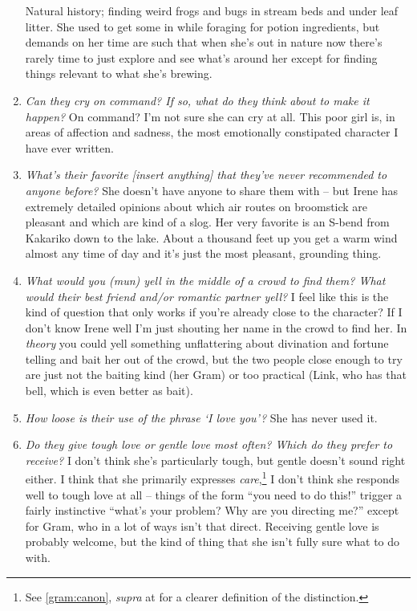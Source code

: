 \begin{enumerate}
      Natural history; finding weird frogs and bugs in stream beds and under leaf litter. She used to get some in while foraging for potion ingredients, but demands on her time are such that when she's out in nature now there's rarely time to just explore and see what's around her except for finding things relevant to what she's brewing.
    \item \label{irene:characterq:emotionallyconstipated}\textit{Can they cry on command? If so, what do they think about to make it happen?}
      On command? I'm not sure she can cry at all. This poor girl is, in areas of affection and sadness, the most emotionally constipated character I have ever written.
    \item \textit{What’s their favorite [insert anything] that they’ve never recommended to anyone before?}
      She doesn't have anyone to share them with -- but Irene has extremely detailed opinions about which air routes on broomstick are pleasant and which are kind of a slog. Her very favorite is an S-bend from Kakariko down to the lake. About a thousand feet up you get a warm wind almost any time of day and it's just the most pleasant, grounding thing.
    \item \textit{What would you (mun) yell in the middle of a crowd to find them? What would their best friend and/or romantic partner yell?}\label{irene:characterq:yell}
      I feel like this is the kind of question that only works if you're already close to the character? If I don't know Irene well I'm just shouting her name in the crowd to find her. In \emph{theory} you could yell something unflattering about divination and fortune telling and bait her out of the crowd, but the two people close enough to try are just not the baiting kind (her Gram) or too practical (Link, who has that bell, which is even better as bait).
    \item \textit{How loose is their use of the phrase ‘I love you’?}\label{irene:characterq:iloveyou}
      She has never used it.
    \item \textit{Do they give tough love or gentle love most often? Which do they prefer to receive?}\label{irene:characterq:toughlove}
      I don't think she's particularly tough, but gentle doesn't sound right either. I think that she primarily expresses \emph{care},\footnote{See \ref{gram:canon}, \textit{supra} at \pageref{gram:canon} for a clearer definition of the distinction.} I don't think she responds well to tough love at all -- things of the form ``you need to do this!'' trigger a fairly instinctive ``what's your problem? Why are you directing me?'' except for Gram, who in a lot of ways isn't that direct. Receiving gentle love is probably welcome, but the kind of thing that she isn't fully sure what to do with. 

\end{enumerate}
